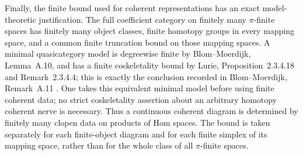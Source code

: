 Finally, the finite bound used for coherent representations has an
exact model-theoretic justification. The full coefficient category on
finitely many $\pi$-finite spaces has finitely many object classes,
finite homotopy groups in every mapping space, and a common finite
truncation bound on those mapping spaces. A minimal quasicategory
model is degreewise finite by Blom--Moerdijk, Lemma~A.10, and has a
finite coskeletality bound by Lurie, Proposition~2.3.4.18 and
Remark~2.3.4.4; this is exactly the conclusion recorded in
Blom--Moerdijk, Remark~A.11
\cite{FA_BlomMoerdijk2023,FA_LurieHTT2009}.
One takes this equivalent minimal model before using finite coherent
data; no strict coskeletality assertion about an arbitrary homotopy
coherent nerve is necessary. Thus a continuous coherent diagram is
determined by finitely many clopen data on products of Hom spaces.
The bound is taken separately for each finite-object diagram and for
each finite simplex of its mapping space, rather than for the whole
class of all $\pi$-finite spaces.
